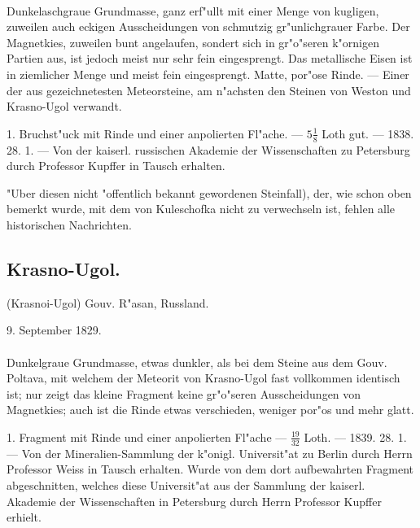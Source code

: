 \documentclass[a4paper, 11pt, oneside, polutonikogreek, german]{article}
\begin{document}
\paragraph{}
Dunkelaschgraue Grundmasse, ganz erf"ullt mit einer Menge von kugligen, zuweilen auch eckigen Ausscheidungen von schmutzig gr"unlichgrauer Farbe. Der Magnetkies, zuweilen bunt angelaufen, sondert sich in gr"o"seren k"ornigen Partien aus, ist jedoch meist nur sehr fein eingesprengt. Das metallische Eisen ist in ziemlicher Menge und meist fein eingesprengt. Matte, por"ose Rinde. --- Einer der aus gezeichnetesten Meteorsteine‚ am n"achsten den Steinen von Weston und Krasno-Ugol verwandt.

1. Bruchst"uck mit Rinde und einer anpolierten Fl"ache. --- $5\frac{1}{8}$ Loth gut. --- 1838. 28. 1. --- Von der kaiserl. russischen Akademie der Wissenschaften zu Petersburg durch Professor Kupffer in Tausch erhalten.

\setlength{\leftskip}{10mm}
\setlength{\parindent}{0pt}

{\footnotesize "Uber diesen nicht "offentlich bekannt gewordenen Steinfall), der, wie schon oben bemerkt wurde, mit dem von Kuleschofka nicht zu verwechseln ist, fehlen alle historischen Nachrichten.}

\setlength{\leftskip}{0pt}
\setlength{\parindent}{20pt}

\subsection{Krasno-Ugol.}
\begin{center}
\small
(Krasnoi-Ugol) Gouv. R"asan, Russland.

9. September 1829.
\end{center}
\paragraph{}
Dunkelgraue Grundmasse, etwas dunkler, als bei dem Steine aus dem Gouv. Poltava, mit welchem der Meteorit von Krasno-Ugol fast vollkommen identisch ist; nur zeigt das kleine Fragment keine gr"o"seren Ausscheidungen von Magnetkies; auch ist die Rinde etwas verschieden, weniger por"os und mehr glatt.

1. Fragment mit Rinde und einer anpolierten Fl"ache --- $\frac{19}{32}$ Loth. --- 1839. 28. 1. --- Von der Mineralien-Sammlung der k"onigl. Universit"at zu Berlin durch Herrn Professor Weiss in Tausch erhalten. Wurde von dem dort aufbewahrten Fragment abgeschnitten, welches diese Universit"at aus der Sammlung der kaiserl. Akademie der Wissenschaften in Petersburg durch Herrn Professor Kupffer erhielt.
\end{document}
